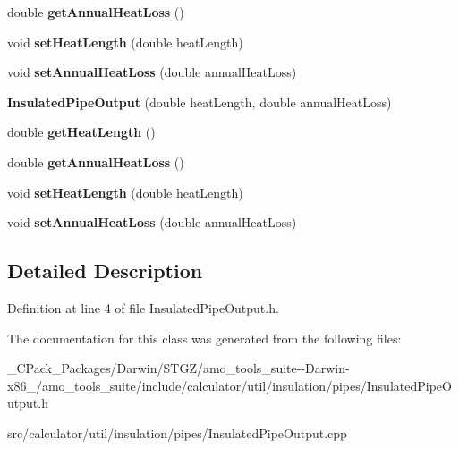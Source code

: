 \begin{DoxyCompactItemize}
double {\bfseries get\+Annual\+Heat\+Loss} ()
\item 
\mbox{\label{class_insulated_pipe_output_aa94860c894820d6e937d850dbfdd938f}} 
void {\bfseries set\+Heat\+Length} (double heat\+Length)
\item 
\mbox{\label{class_insulated_pipe_output_a4519c6b375daa98354d334b9067aaef3}} 
void {\bfseries set\+Annual\+Heat\+Loss} (double annual\+Heat\+Loss)
\item 
\mbox{\label{class_insulated_pipe_output_ae9ef30156790c18f04193ed7fae3695a}} 
{\bfseries Insulated\+Pipe\+Output} (double heat\+Length, double annual\+Heat\+Loss)
\item 
\mbox{\label{class_insulated_pipe_output_a65e3496378f7d837915f0ed194c4fefa}} 
double {\bfseries get\+Heat\+Length} ()
\item 
\mbox{\label{class_insulated_pipe_output_a6ef77da2d904b9498f68abfd78df35c2}} 
double {\bfseries get\+Annual\+Heat\+Loss} ()
\item 
\mbox{\label{class_insulated_pipe_output_aa94860c894820d6e937d850dbfdd938f}} 
void {\bfseries set\+Heat\+Length} (double heat\+Length)
\item 
\mbox{\label{class_insulated_pipe_output_a4519c6b375daa98354d334b9067aaef3}} 
void {\bfseries set\+Annual\+Heat\+Loss} (double annual\+Heat\+Loss)
\end{DoxyCompactItemize}


\subsection{Detailed Description}


Definition at line 4 of file Insulated\+Pipe\+Output.\+h.



The documentation for this class was generated from the following files\+:\begin{DoxyCompactItemize}
\item 
\+\_\+\+C\+Pack\+\_\+\+Packages/\+Darwin/\+S\+T\+G\+Z/amo\+\_\+tools\+\_\+suite-\/-\/\+Darwin-\/x86\+\_/amo\+\_\+tools\+\_\+suite/include/calculator/util/insulation/pipes/Insulated\+Pipe\+Output.\+h\item 
src/calculator/util/insulation/pipes/Insulated\+Pipe\+Output.\+cpp\end{DoxyCompactItemize}
